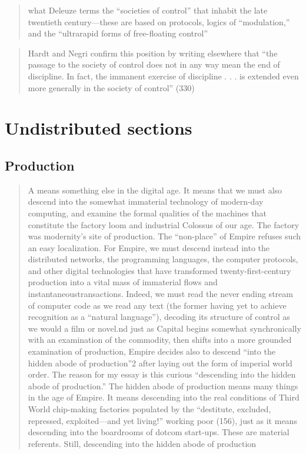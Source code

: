 \begin{quote}
	what Deleuze terms the “societies of  control” that inhabit the late twentieth century—these are based on protocols, logics of “modulation,” and the “ultrarapid forms of free-floating control”
	\parencite[86]{galloway2004}
\end{quote}

\begin{quote}
	Hardt and Negri confirm this position by writing elsewhere that “the passage to the society of control does not in any way mean the end of discipline. In fact, the immanent exercise of discipline . . . is extended even more generally in the society of control” (330)
	\parencite[83]{galloway2001}
\end{quote}

\chapter{Undistributed sections}\label{chap:Undistributed sections} %
\section{Production}
\begin{quote}
	A means something else in the digital age. It means that we must also descend into the somewhat immaterial technology of modern-day computing, and examine the formal qualities of the machines that constitute the factory loom and industrial Colossus of our age. The factory was modernity’s site of production. The “non-place” of Empire refuses such an easy localization. For Empire, we must descend instead into the distributed networks, the programming languages, the computer protocols, and other digital technologies that have transformed twenty-first-century production into a vital mass of immaterial flows and instantaneoustransactions. Indeed, we must read the never ending stream of computer code as we read any text (the former having yet to achieve recognition as a “natural language”), decoding its structure of control as we would a film or novel.nd just as Capital begins somewhat synchronically with an examination of the commodity, then shifts into a more grounded examination of production, Empire decides also to descend “into the hidden abode of production”2 after laying out the form of imperial world order. The reason for my essay is this curious “descending into the hidden abode of production.” The hidden abode of production means many things in the age of Empire. It means descending into the real conditions of Third World chip-making factories populated by the “destitute, excluded, repressed, exploited—and yet living!” working poor (156), just as it means descending into the boardrooms of dotcom start-ups. These are material referents. Still, descending into the hidden abode of production
	\parencite[82]{galloway2001}
\end{quote}


